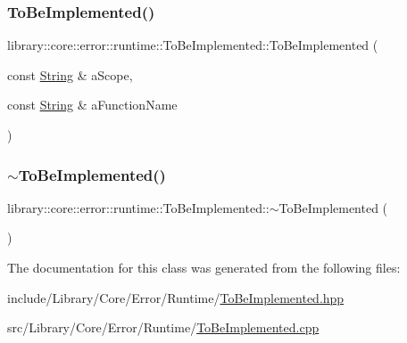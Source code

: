 \mbox{\label{classlibrary_1_1core_1_1error_1_1runtime_1_1ToBeImplemented_a97439e9669fa5c1926de93fc0446f583}} 
\subsubsection{\texorpdfstring{To\+Be\+Implemented()}{ToBeImplemented()}\hspace{0.1cm}{\footnotesize\ttfamily [3/3]}}
{\footnotesize\ttfamily library\+::core\+::error\+::runtime\+::\+To\+Be\+Implemented\+::\+To\+Be\+Implemented (\begin{DoxyParamCaption}\item[{const \hyperlink{classlibrary_1_1core_1_1types_1_1String}{String} \&}]{a\+Scope,  }\item[{const \hyperlink{classlibrary_1_1core_1_1types_1_1String}{String} \&}]{a\+Function\+Name }\end{DoxyParamCaption})}

\mbox{\label{classlibrary_1_1core_1_1error_1_1runtime_1_1ToBeImplemented_a4d6d8204b46f1f5eb41458849a891787}} 
\subsubsection{\texorpdfstring{$\sim$\+To\+Be\+Implemented()}{~ToBeImplemented()}}
{\footnotesize\ttfamily library\+::core\+::error\+::runtime\+::\+To\+Be\+Implemented\+::$\sim$\+To\+Be\+Implemented (\begin{DoxyParamCaption}{ }\end{DoxyParamCaption})}



The documentation for this class was generated from the following files\+:\begin{DoxyCompactItemize}
\item 
include/\+Library/\+Core/\+Error/\+Runtime/\hyperlink{ToBeImplemented_8hpp}{To\+Be\+Implemented.\+hpp}\item 
src/\+Library/\+Core/\+Error/\+Runtime/\hyperlink{ToBeImplemented_8cpp}{To\+Be\+Implemented.\+cpp}\end{DoxyCompactItemize}
